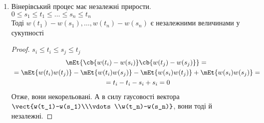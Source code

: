 \begin{enumerate}
\begin{proof}
	\begin{equation}
	\mEt{w(t+h)-w(t)} = 0
	\end{equation}
	\begin{multline}
	\mDt{w(t+h)-w(t)} ={} \\ {} = \mEt{\cb{w(t+h)-w(t)}^2} = \mEt{w^2(t+h)}+\mEt{w^2(t)} - {} \\ {} - 2\mEt{w(t+h)w(t)} = h
	\end{multline}
	\end{proof}	
\item Вінерівський процес має незалежні прирости. \\
	$0\leq s_1\leq t_1 \leq \ldots\leq s_n\leq t_n$\\
	Тоді $w(t_1)-w(s_1),\ldots,w(t_n)-w(s_n)$ є незалежними величинами у сукупності
	\begin{proof}
	$s_i\leq t_i \leq s_j \leq t_j$\\
	\begin{multline}
	\mEt{\cb{w(t_i)-w(s_i)}\cb{w(t_j)-w(s_j)}} = {} \\ {} = \mEt{w(t_i)w(t_j)} - \mEt{w(t_i)w(s_j)} - \mEt{w(s_i)w(t_j)} +\mEt{w(s_i)w(s_j)} 			={} \\ {} = t_i-t_i - 			s_i + s_i = 0
	\end{multline}
	Отже, вони некорельовані. А в силу гаусовості вектора $\vect{w(t_1)-w(s_1)\\\vdots\\w(t_n)-w(s_n)}$, вони тоді й незалежні.
	\end{proof}
\end{enumerate}